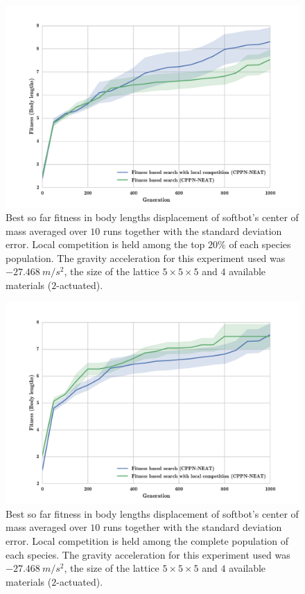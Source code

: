\begin{figure}[h!]
\centering
\includegraphics[width=1.0\textwidth]{../Figures/Results/FitVsFitCompSize5.pdf}
\caption{Best so far fitness in body lengths displacement of softbot's center of mass averaged over $10$ runs together with the standard deviation error. Local competition is held among the top $20\%$ of each species population. The gravity acceleration for this experiment used was $-27.468\   m/s^2$, the size of the lattice $5\times 5\times5$ and $4$ available materials ($2$-actuated).}
\label{fig:FitVsFitCompSize5}
\end{figure}

\begin{figure}[h!]
\centering
\includegraphics[width=1.0\textwidth]{../Figures/Results/fitComp100percent.pdf}
\caption{Best so far fitness in body lengths displacement of softbot's center of mass averaged over $10$ runs together with the standard deviation error. Local competition is held among the complete population of each species. The gravity acceleration for this experiment used was $-27.468\   m/s^2$, the size of the lattice $5\times 5\times5$ and $4$ available materials ($2$-actuated).}
\label{fig:fitComp100percent}
\end{figure}


